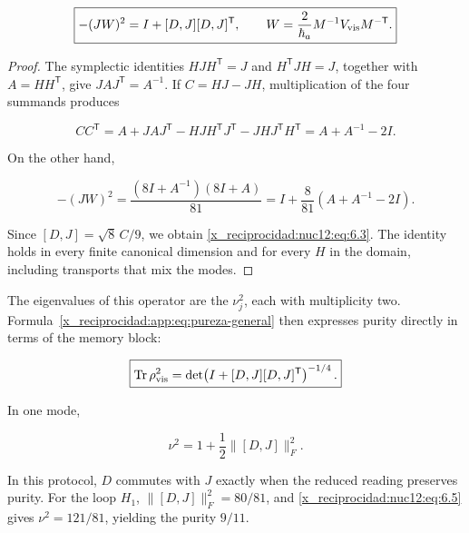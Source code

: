 \begin{equation}
\boxed{-(JW)^2=I+[D,J][D,J]^{\mathsf T},\qquad
W=\frac{2}{\hbar_a}M^{-1}V_{\rm vis}M^{-\mathsf T}.}
\label{x_reciprocidad:nuc12:eq:6.3}
\end{equation}



\begin{proof}
The symplectic identities \(HJH^{\mathsf T}=J\) and \(H^{\mathsf T}JH=J\), together with \(A=HH^{\mathsf T}\), give \(JAJ^{\mathsf T}=A^{-1}\). If \(C=HJ-JH\), multiplication of the four summands produces



\[
CC^{\mathsf T}
=A+JAJ^{\mathsf T}
-HJH^{\mathsf T}J^{\mathsf T}
-JHJ^{\mathsf T}H^{\mathsf T}
=A+A^{-1}-2I.
\]



On the other hand,



\[
-(JW)^2
=\frac{(8I+A^{-1})(8I+A)}{81}
=I+\frac8{81}(A+A^{-1}-2I).
\]



Since \([D,J]=\sqrt8\,C/9\), we obtain \eqref{x_reciprocidad:nuc12:eq:6.3}. The identity holds in every finite canonical dimension and for every \(H\) in the domain, including transports that mix the modes.
\end{proof}

The eigenvalues of this operator are the \(\nu_j^2\), each with multiplicity two. Formula~\eqref{x_reciprocidad:app:eq:pureza-general} then expresses purity directly in terms of the memory block:



\begin{equation}
\boxed{\operatorname{Tr}\rho_{\rm vis}^2
=\det\!\left(I+[D,J][D,J]^{\mathsf T}\right)^{-1/4}.}
\label{x_reciprocidad:nuc12:eq:6.4}
\end{equation}



In one mode,



\begin{equation}
\nu^2=1+\frac12\|[D,J]\|_F^2.
\label{x_reciprocidad:nuc12:eq:6.5}
\end{equation}



In this protocol, \(D\) commutes with \(J\) exactly when the reduced reading preserves purity. For the loop \(H_1\), \(\|[D,J]\|_F^2=80/81\), and \eqref{x_reciprocidad:nuc12:eq:6.5} gives \(\nu^2=121/81\), yielding the purity \(9/11\).

